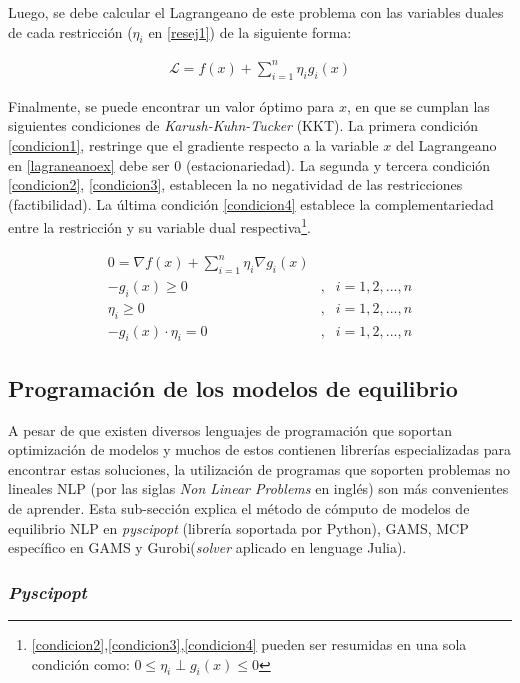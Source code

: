 Luego, se debe calcular el Lagrangeano de este problema con las variables duales de cada restricción ($\eta_{i}$ en \ref{resej1}) de la siguiente forma:

\begin{align}
    \mathcal{L}=f(x) +  \sum_{i=1}^{n}\eta_{i}g_{i}(x)\label{lagraneanoex}
\end{align}

Finalmente, se puede encontrar un valor óptimo para $x$, en que se cumplan las siguientes condiciones de \textit{Karush-Kuhn-Tucker} (KKT). La primera condición \ref{condicion1}, restringe que el gradiente respecto a la variable $x$ del Lagrangeano en \ref{lagraneanoex} debe ser 0 (estacionariedad). La segunda y tercera condición \ref{condicion2}, \ref{condicion3}, establecen la no negatividad de las restricciones (factibilidad). La última condición \ref{condicion4} establece la complementariedad entre la restricción y su variable dual respectiva\footnote{\ref{condicion2},\ref{condicion3},\ref{condicion4} pueden ser resumidas en una sola condición como: $0\leq\eta_{i}\perp g_{i}(x)\leq 0$}. 

\begin{align}
    0 = \nabla f(x) + \sum_{i=1}^{n} \eta_{i}\nabla g_{i}(x) \label{condicion1}\\
    -g_{i}(x) \geq 0 &, & i=1,2,...,n  \label{condicion2}\\
    \eta_{i} \geq 0 &, & i=1,2,...,n \label{condicion3}\\
    -g_{i}(x)\cdot \eta_{i} = 0 &, & i=1,2,...,n \label{condicion4}
\end{align}

\subsection{Programación de los modelos de equilibrio}\label{explisolvers}

A pesar de que existen diversos lenguajes de programación que soportan optimización de modelos y muchos de estos contienen librerías especializadas para encontrar estas soluciones, la utilización de programas que soporten problemas no lineales NLP (por las siglas \emph{Non Linear Problems} en inglés) son más convenientes de aprender. Esta sub-sección explica el método de cómputo de modelos de equilibrio NLP en \textit{pyscipopt} (librería soportada por Python), GAMS, MCP específico en GAMS y Gurobi(\textit{solver} aplicado en lenguage Julia).

\subsubsection{\textit{Pyscipopt}}

